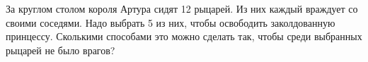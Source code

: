 \question
За круглом столом короля Артура сидят 12 рыцарей. Из них каждый враждует со своими соседями. Надо выбрать 5 из них, чтобы освободить заколдованную принцессу. Сколькими способами это можно сделать так, чтобы среди выбранных рыцарей не было врагов?
